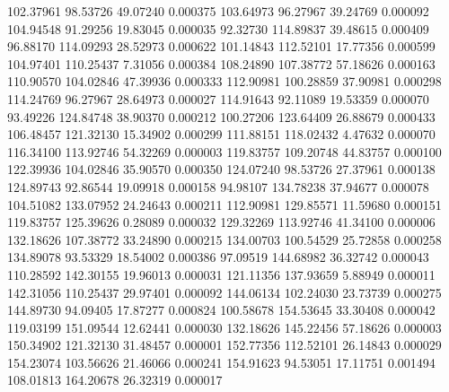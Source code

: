       102.37961       98.53726       49.07240       0.000375
      103.64973       96.27967       39.24769       0.000092
      104.94548       91.29256       19.83045       0.000035
       92.32730      114.89837       39.48615       0.000409
       96.88170      114.09293       28.52973       0.000622
      101.14843      112.52101       17.77356       0.000599
      104.97401      110.25437        7.31056       0.000384
      108.24890      107.38772       57.18626       0.000163
      110.90570      104.02846       47.39936       0.000333
      112.90981      100.28859       37.90981       0.000298
      114.24769       96.27967       28.64973       0.000027
      114.91643       92.11089       19.53359       0.000070
       93.49226      124.84748       38.90370       0.000212
      100.27206      123.64409       26.88679       0.000433
      106.48457      121.32130       15.34902       0.000299
      111.88151      118.02432        4.47632       0.000070
      116.34100      113.92746       54.32269       0.000003
      119.83757      109.20748       44.83757       0.000100
      122.39936      104.02846       35.90570       0.000350
      124.07240       98.53726       27.37961       0.000138
      124.89743       92.86544       19.09918       0.000158
       94.98107      134.78238       37.94677       0.000078
      104.51082      133.07952       24.24643       0.000211
      112.90981      129.85571       11.59680       0.000151
      119.83757      125.39626        0.28089       0.000032
      129.32269      113.92746       41.34100       0.000006
      132.18626      107.38772       33.24890       0.000215
      134.00703      100.54529       25.72858       0.000258
      134.89078       93.53329       18.54002       0.000386
       97.09519      144.68982       36.32742       0.000043
      110.28592      142.30155       19.96013       0.000031
      121.11356      137.93659        5.88949       0.000011
      142.31056      110.25437       29.97401       0.000092
      144.06134      102.24030       23.73739       0.000275
      144.89730       94.09405       17.87277       0.000824
      100.58678      154.53645       33.30408       0.000042
      119.03199      151.09544       12.62441       0.000030
      132.18626      145.22456       57.18626       0.000003
      150.34902      121.32130       31.48457       0.000001
      152.77356      112.52101       26.14843       0.000029
      154.23074      103.56626       21.46066       0.000241
      154.91623       94.53051       17.11751       0.001494
      108.01813      164.20678       26.32319       0.000017
